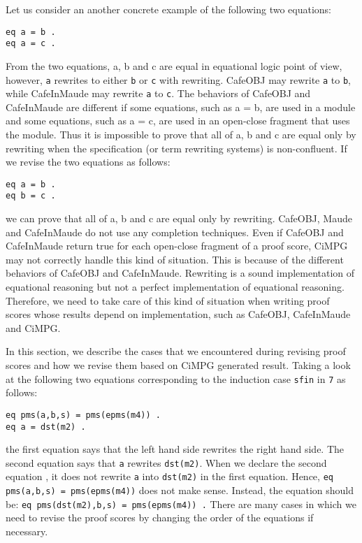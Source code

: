\documentclass[a4paper,fleqn]{cas-dc}
\begin{document}
Let us consider an another concrete example of the following two equations:
\begin{small}
\begin{verbatim}
eq a = b .
eq a = c .
\end{verbatim}
\end{small}
From the two equations, a, b and c are equal in equational logic point of view, however, \verb!a! rewrites to either \verb!b! or \verb!c! with rewriting.
CafeOBJ may rewrite \verb!a! to \verb!b!, while CafeInMaude may rewrite \verb!a! to \verb!c!. The behaviors of CafeOBJ and CafeInMaude are different if some
equations, such as a = b, are used in a module and some equations, such as a = c, are used in an open-close fragment that uses the module. Thus it is impossible to prove that all of a, b and c are equal only by rewriting when the specification (or term rewriting systems) is non-confluent.
If we revise the two equations as follows:
\begin{small}
\begin{verbatim}
eq a = b .
eq b = c .
\end{verbatim}
\end{small}
we can prove that all of a, b and c are equal only by rewriting. CafeOBJ, Maude and CafeInMaude do not use any completion techniques. Even if CafeOBJ and CafeInMaude return true for each open-close fragment of a proof
score, CiMPG may not correctly handle this kind of situation. This is because of the different behaviors of CafeOBJ and CafeInMaude. Rewriting is a sound implementation of equational reasoning but not a perfect implementation of equational reasoning. Therefore, we need to take care of this kind of situation when writing proof scores whose results depend on implementation, such as CafeOBJ, CafeInMaude and CiMPG.

In this section, we describe the cases that we encountered during revising proof scores and how we revise them based on CiMPG generated result. Taking a look at the following two equations corresponding to the induction case \verb!sfin! in \verb!7! as follows:
\begin{small}
\begin{verbatim}
eq pms(a,b,s) = pms(epms(m4)) .
eq a = dst(m2) .
\end{verbatim}
\end{small}
the first equation says that the left hand side rewrites the right hand side. The second equation says that \verb!a! rewrites \verb!dst(m2)!. When we declare the second equation , it does not rewrite \verb!a! into \verb!dst(m2)! in the first equation. Hence, \verb!eq pms(a,b,s) = pms(epms(m4))! does not make sense. Instead, the equation should be: \verb!eq pms(dst(m2),b,s) = pms(epms(m4)) .! There are many cases in which we need to revise the proof scores by changing the order of the equations if necessary.
\end{document}

